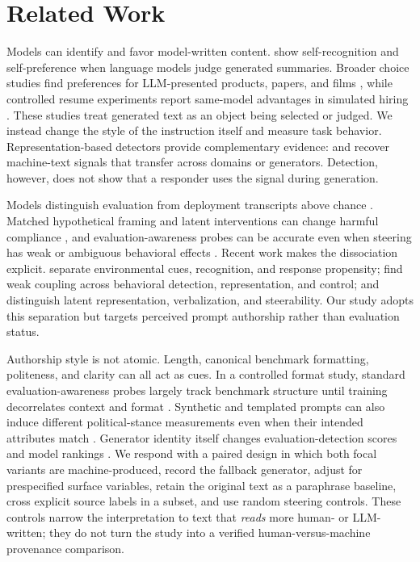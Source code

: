 \section{Related Work}
\label{sec:related}

Models can identify and favor model-written content. \citet{panickssery2024evaluators} show self-recognition and self-preference when language models judge generated summaries. Broader choice studies find preferences for LLM-presented products, papers, and films \citep{laurito2024aiai}, while controlled resume experiments report same-model advantages in simulated hiring \citep{xu2025hiring}. These studies treat generated text as an object being selected or judged. We instead change the style of the instruction itself and measure task behavior. Representation-based detectors provide complementary evidence: \citet{chen2025repreguard} and \citet{quaremba2026linear} recover machine-text signals that transfer across domains or generators. Detection, however, does not show that a responder uses the signal during generation.

Models distinguish evaluation from deployment transcripts above chance \citep{needham2025know}. Matched hypothetical framing and latent interventions can change harmful compliance \citep{abdelnabi2025hawthorne}, and evaluation-awareness probes can be accurate even when steering has weak or ambiguous behavioral effects \citep{nguyen2025probing}. Recent work makes the dissociation explicit. \citet{li2026decomposing} separate environmental cues, recognition, and response propensity; \citet{nayan2026capability} find weak coupling across behavioral detection, representation, and control; and \citet{heidari2026representation} distinguish latent representation, verbalization, and steerability. Our study adopts this separation but targets perceived prompt authorship rather than evaluation status.

Authorship style is not atomic. Length, canonical benchmark formatting, politeness, and clarity can all act as cues. In a controlled format study, standard evaluation-awareness probes largely track benchmark structure until training decorrelates context and format \citep{devbunova2026format}. Synthetic and templated prompts can also induce different political-stance measurements even when their intended attributes match \citep{chalkidis2026templated}. Generator identity itself changes evaluation-detection scores and model rankings \citep{li2026evaldetectbench}. We respond with a paired design in which both focal variants are machine-produced, record the fallback generator, adjust for prespecified surface variables, retain the original text as a paraphrase baseline, cross explicit source labels in a subset, and use random steering controls. These controls narrow the interpretation to text that \emph{reads} more human- or LLM-written; they do not turn the study into a verified human-versus-machine provenance comparison.

